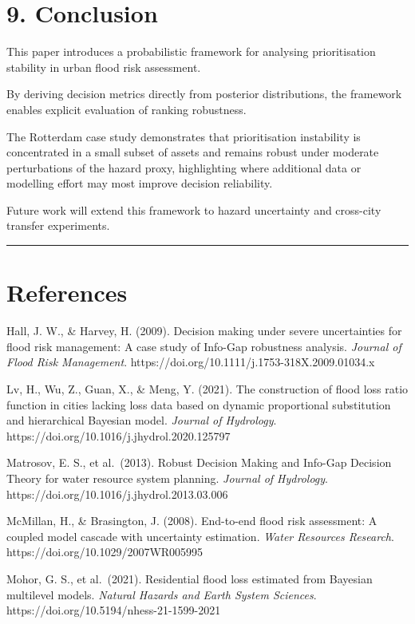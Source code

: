 \documentclass[
]{article}
\begin{document}
\section{9. Conclusion}\label{conclusion}

This paper introduces a probabilistic framework for analysing
prioritisation stability in urban flood risk assessment.

By deriving decision metrics directly from posterior distributions, the
framework enables explicit evaluation of ranking robustness.

The Rotterdam case study demonstrates that prioritisation instability is
concentrated in a small subset of assets and remains robust under
moderate perturbations of the hazard proxy, highlighting where
additional data or modelling effort may most improve decision
reliability.

Future work will extend this framework to hazard uncertainty and
cross-city transfer experiments.

\begin{center}\rule{0.5\linewidth}{0.5pt}\end{center}

\section{References}\label{references}

Hall, J. W., \& Harvey, H. (2009). Decision making under severe
uncertainties for flood risk management: A case study of Info-Gap
robustness analysis. \emph{Journal of Flood Risk Management}.
https://doi.org/10.1111/j.1753-318X.2009.01034.x

Lv, H., Wu, Z., Guan, X., \& Meng, Y. (2021). The construction of flood
loss ratio function in cities lacking loss data based on dynamic
proportional substitution and hierarchical Bayesian model. \emph{Journal
of Hydrology}. https://doi.org/10.1016/j.jhydrol.2020.125797

Matrosov, E. S., et al.~(2013). Robust Decision Making and Info-Gap
Decision Theory for water resource system planning. \emph{Journal of
Hydrology}. https://doi.org/10.1016/j.jhydrol.2013.03.006

McMillan, H., \& Brasington, J. (2008). End-to-end flood risk
assessment: A coupled model cascade with uncertainty estimation.
\emph{Water Resources Research}. https://doi.org/10.1029/2007WR005995

Mohor, G. S., et al.~(2021). Residential flood loss estimated from
Bayesian multilevel models. \emph{Natural Hazards and Earth System
Sciences}. https://doi.org/10.5194/nhess-21-1599-2021
\end{document}
